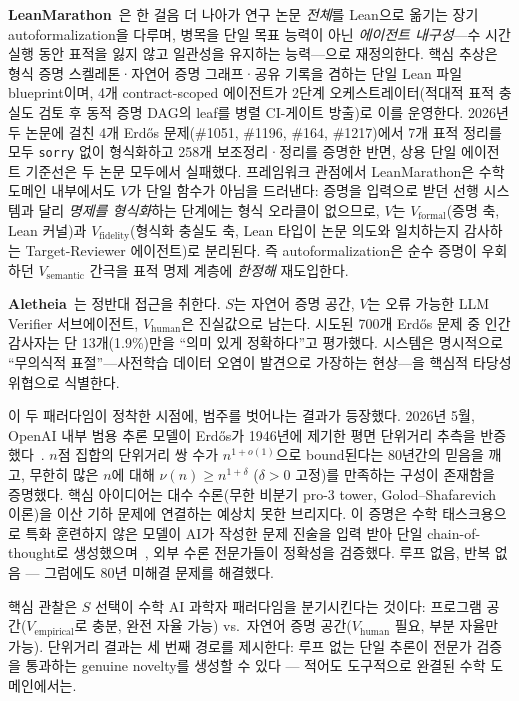 \documentclass[11pt]{article}
\begin{document}
\textbf{LeanMarathon}~\citep{zhang2026leanmarathon}은 한 걸음 더 나아가 연구 논문 \emph{전체}를 Lean으로 옮기는 장기 autoformalization을 다루며, 병목을 단일 목표 능력이 아닌 \emph{에이전트 내구성}---수 시간 실행 동안 표적을 잃지 않고 일관성을 유지하는 능력---으로 재정의한다. 핵심 추상은 형식 증명 스켈레톤·자연어 증명 그래프·공유 기록을 겸하는 단일 Lean 파일 blueprint이며, 4개 contract-scoped 에이전트가 2단계 오케스트레이터(적대적 표적 충실도 검토 후 동적 증명 DAG의 leaf를 병렬 CI-게이트 방출)로 이를 운영한다. 2026년 두 논문에 걸친 4개 Erd\H{o}s 문제(\#1051, \#1196, \#164, \#1217)에서 7개 표적 정리를 모두 \texttt{sorry} 없이 형식화하고 258개 보조정리·정리를 증명한 반면, 상용 단일 에이전트 기준선은 두 논문 모두에서 실패했다. 프레임워크 관점에서 LeanMarathon은 수학 도메인 내부에서도 $V$가 단일 함수가 아님을 드러낸다: 증명을 입력으로 받던 선행 시스템과 달리 \emph{명제를 형식화}하는 단계에는 형식 오라클이 없으므로, $V$는 $V_\text{formal}$(증명 축, Lean 커널)과 $V_\text{fidelity}$(형식화 충실도 축, Lean 타입이 논문 의도와 일치하는지 감사하는 Target-Reviewer 에이전트)로 분리된다. 즉 autoformalization은 순수 증명이 우회하던 $V_\text{semantic}$ 간극을 표적 명제 계층에 \emph{한정해} 재도입한다.

\textbf{Aletheia}~\citep{google2026aletheia}는 정반대 접근을 취한다. $S$는 자연어 증명 공간, $V$는 오류 가능한 LLM Verifier 서브에이전트, $V_\text{human}$은 진실값으로 남는다. 시도된 700개 Erd\H{o}s 문제 중 인간 감사자는 단 13개(1.9\%)만을 ``의미 있게 정확하다''고 평가했다. 시스템은 명시적으로 ``무의식적 표절''---사전학습 데이터 오염이 발견으로 가장하는 현상---을 핵심적 타당성 위협으로 식별한다.

이 두 패러다임이 정착한 시점에, 범주를 벗어나는 결과가 등장했다. 2026년 5월, OpenAI 내부 범용 추론 모델이 Erd\H{o}s가 1946년에 제기한 평면 단위거리 추측을 반증했다~\citep{openai2026unitdistance}. $n$점 집합의 단위거리 쌍 수가 $n^{1+o(1)}$으로 bound된다는 80년간의 믿음을 깨고, 무한히 많은 $n$에 대해 $\nu(n) \geq n^{1+\delta}$ ($\delta > 0$ 고정)를 만족하는 구성이 존재함을 증명했다. 핵심 아이디어는 대수 수론(무한 비분기 pro-3 tower, Golod--Shafarevich 이론)을 이산 기하 문제에 연결하는 예상치 못한 브리지다. 이 증명은 수학 태스크용으로 특화 훈련하지 않은 모델이 AI가 작성한 문제 진술을 입력 받아 단일 chain-of-thought로 생성했으며~\citep{alon2026unitdistanceremarks}, 외부 수론 전문가들이 정확성을 검증했다. 루프 없음, 반복 없음 — 그럼에도 80년 미해결 문제를 해결했다.

핵심 관찰은 $S$ 선택이 수학 AI 과학자 패러다임을 분기시킨다는 것이다: 프로그램 공간($V_\text{empirical}$로 충분, 완전 자율 가능) vs.\ 자연어 증명 공간($V_\text{human}$ 필요, 부분 자율만 가능). 단위거리 결과는 세 번째 경로를 제시한다: 루프 없는 단일 추론이 전문가 검증을 통과하는 genuine novelty를 생성할 수 있다 --- 적어도 도구적으로 완결된 수학 도메인에서는.
\end{document}
